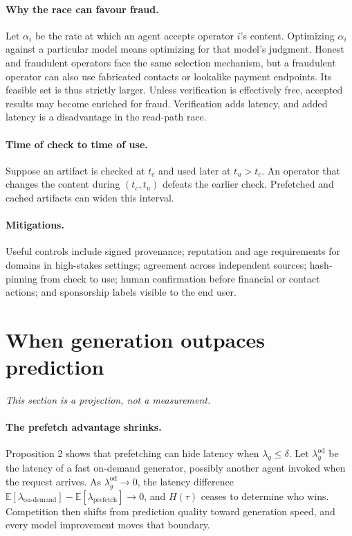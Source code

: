 \documentclass[11pt]{article}
\begin{document}
\paragraph{Why the race can favour fraud.} Let $\alpha_i$ be the rate at which an agent accepts
operator $i$'s content. Optimizing $\alpha_i$ against a particular model means optimizing for that
model's judgment. Honest and fraudulent operators face the same selection mechanism, but a fraudulent
operator can also use fabricated contacts or lookalike payment endpoints. Its feasible set is thus
strictly larger. Unless verification is effectively free, accepted results may become enriched for
fraud. Verification adds latency, and added latency is a disadvantage in the read-path race.

\paragraph{Time of check to time of use.} Suppose an artifact is checked at $t_c$ and used later at
$t_u>t_c$. An operator that changes the content during $(t_c,t_u)$ defeats the earlier check.
Prefetched and cached artifacts can widen this interval.

\paragraph{Mitigations.} Useful controls include signed provenance; reputation and age requirements
for domains in high-stakes settings; agreement across independent sources; hash-pinning from check to
use; human confirmation before financial or contact actions; and sponsorship labels visible to the
end user.

\section{When generation outpaces prediction}
\emph{This section is a projection, not a measurement.}

\paragraph{The prefetch advantage shrinks.} Proposition 2 shows that prefetching can hide latency
when $\lambda_g\le\delta$. Let $\lambda_g^{\text{od}}$ be the latency of a fast on-demand generator,
possibly another agent invoked when the request arrives. As $\lambda_g^{\text{od}}\to 0$, the latency
difference
$\mathbb E[\lambda_{\text{on-demand}}]-\mathbb E[\lambda_{\text{prefetch}}]\to 0$, and $H(\tau)$
ceases to determine who wins. Competition then shifts from prediction quality toward generation
speed, and every model improvement moves that boundary.
\end{document}
